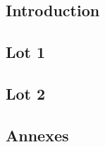 \documentclass[asi]{picInsa}
\title{\PTV{}}
\author{\Michel} %
\begin{document}
\couverture{}

 \informationsGenerales{}


\tableofcontents

\setcounter{chapter}{0}


\chapter{Introduction}
\label{introduction}


\chapter{Lot 1}
\label{lot1}


\chapter{Lot 2}
\label{lot2}



\begin{appendix}
\part*{Annexes}
\listoffigures
{}

\end{appendix}


\pageQuatriemeCouverture
\end{document}
